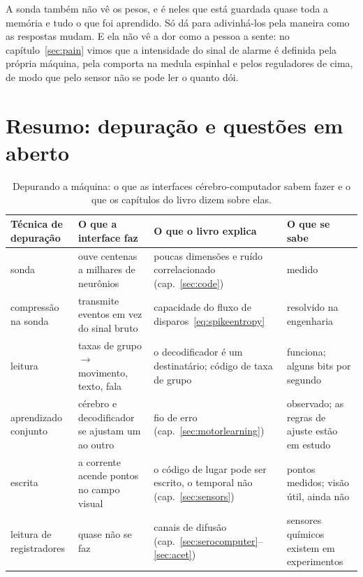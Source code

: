 A sonda também não vê os pesos, e é neles que está guardada quase toda a memória e tudo o que foi aprendido. Só dá para adivinhá-los pela maneira como as respostas mudam. E ela não vê a dor como a pessoa a sente: no capítulo~\ref{sec:pain} vimos que a intensidade do sinal de alarme é definida pela própria máquina, pela comporta na medula espinhal e pelos reguladores de cima, de modo que pelo sensor não se pode ler o quanto dói.

\section{Resumo: depuração e questões em aberto}

\begin{table}[t]
\centering
\footnotesize
\setlength{\tabcolsep}{4pt}
\renewcommand{\arraystretch}{1.15}
\begin{tabular}{>{\raggedright}p{2.2cm}>{\raggedright}p{3.6cm}>{\raggedright}p{3.4cm}>{\raggedright\arraybackslash}p{4.0cm}}
\toprule
Técnica de depuração & O que a interface faz & O que o livro explica & O que se sabe \\
\midrule
sonda & ouve centenas a milhares de neurônios & poucas dimensões e ruído correlacionado (cap.~\ref{sec:code}) & medido \\
compressão na sonda & transmite eventos em vez do sinal bruto & capacidade do fluxo de disparos~\eqref{eq:spikeentropy} & resolvido na engenharia \\
leitura & taxas de grupo $\to$ movimento, texto, fala & o decodificador é um destinatário; código de taxa de grupo & funciona; alguns bits por segundo \\
aprendizado conjunto & cérebro e decodificador se ajustam um ao outro & fio de erro (cap.~\ref{sec:motorlearning}) & observado; as regras de ajuste estão em estudo \\
escrita & a corrente acende pontos no campo visual & o código de lugar pode ser escrito, o temporal não (cap.~\ref{sec:sensors}) & pontos medidos; visão útil, ainda não \\
leitura de registradores & quase não se faz & canais de difusão (cap.~\ref{sec:serocomputer}--\ref{sec:acet}) & sensores químicos existem em experimentos \\
\bottomrule
\end{tabular}
\caption{Depurando a máquina: o que as interfaces cérebro-computador sabem fazer e o que os capítulos do livro dizem sobre elas.}
\label{tab:debugging}
\end{table}

